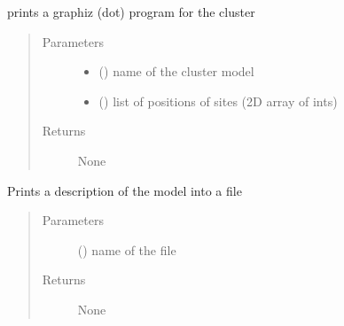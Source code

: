 \documentclass[letterpaper,10pt,english]{sphinxmanual}
\begin{document}
\begin{fulllineitems}
\label{\detokenize{functions:pyqcm.print_graph}}
\sphinxAtStartPar
prints a graphiz (dot) program for the cluster
\begin{quote}\begin{description}
\item[{Parameters}] \leavevmode\begin{itemize}
\item {} 
\sphinxAtStartPar
{} () \textendash{} name of the cluster model

\item {} 
\sphinxAtStartPar
{} (\sphinxstyleliteralemphasis{\sphinxupquote{{[}}}\sphinxstyleliteralemphasis{\sphinxupquote{{[}}}\sphinxstyleliteralemphasis{\sphinxupquote{{]}}}\sphinxstyleliteralemphasis{\sphinxupquote{{]}}}) \textendash{} list of positions of sites (2D array of ints)

\end{itemize}

\item[{Returns}] \leavevmode
\sphinxAtStartPar
None

\end{description}\end{quote}

\end{fulllineitems}


\begin{fulllineitems}
\label{\detokenize{functions:pyqcm.print_model}}
\sphinxAtStartPar
Prints a description of the model into a file
\begin{quote}\begin{description}
\item[{Parameters}] \leavevmode
\sphinxAtStartPar
{} () \textendash{} name of the file

\item[{Returns}] \leavevmode
\sphinxAtStartPar
None

\end{description}\end{quote}

\end{fulllineitems}
\end{document}
